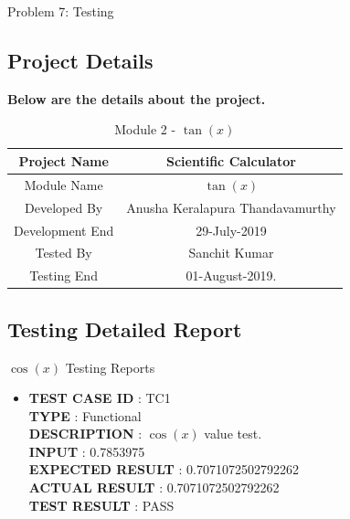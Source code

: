 \documentclass[a4paper,12pt]{article}
\begin{document}
\newpage

\begin{section}{Problem 7: Testing}

\subsection{Project Details}
\textbf{Below are the details about the project.}
\renewcommand{\arraystretch}{1.5}
\begin{table}[htp]
	\centering
	\caption{Module 2 - $\tan(x)$} \vspace{0.5cm} \label{tab:definition_table} 
	\begin{tabular}{||c|c||}
		\hline \hline 
		\LARGE Project Name & \LARGE Scientific Calculator  \\ 
		\hline
		\LARGE Module Name & \LARGE $\tan(x)$  \\
		\hline
		\LARGE Developed By & \LARGE Anusha Keralapura Thandavamurthy \\
		\hline
		\LARGE Development End & \LARGE 29-July-2019 \\
		\hline  
		\LARGE Tested By & \LARGE Sanchit Kumar \\
		\hline 
		\LARGE Testing End & \LARGE 01-August-2019. \\
		\hline \hline
	\end{tabular}
\end{table}

\subsection{Testing Detailed Report}
\begin{subsubsection}{$\cos(x)$ Testing Reports}
\begin{itemize}
	
	\item \textbf{TEST CASE ID} \hspace{1.25cm} : TC1  \\
	\textbf{TYPE } \hspace{3.15cm}  : Functional\\
	\textbf{DESCRIPTION }\hspace{1.25cm} : $\cos(x)$ value test. \\
	\textbf{INPUT} \hspace{3.05cm} :  0.7853975 \\
	\textbf{EXPECTED RESULT}\hspace{0.07cm} : 0.7071072502792262 \\
	\textbf{ACTUAL RESULT} \hspace{0.6cm} : 0.7071072502792262 \\
	\textbf{TEST RESULT} \hspace{1.40cm} : PASS \\
	

\end{itemize}
\end{subsubsection}
\end{section}
\end{document}
